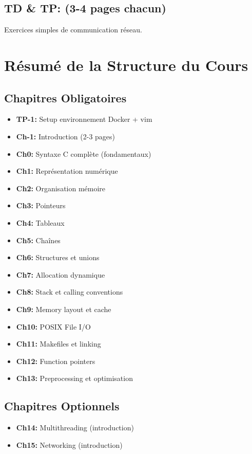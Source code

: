 \documentclass[10pt,a4paper]{article}
\begin{document}
\subsection*{TD \& TP: (3-4 pages chacun)}

Exercices simples de communication réseau.

\newpage

\section*{Résumé de la Structure du Cours}

\subsection*{Chapitres Obligatoires}

\begin{itemize}
\item \textbf{TP-1:} Setup environnement Docker + vim
\item \textbf{Ch-1:} Introduction (2-3 pages)
\item \textbf{Ch0:} Syntaxe C complète (fondamentaux)
\item \textbf{Ch1:} Représentation numérique
\item \textbf{Ch2:} Organisation mémoire
\item \textbf{Ch3:} Pointeurs
\item \textbf{Ch4:} Tableaux
\item \textbf{Ch5:} Chaînes
\item \textbf{Ch6:} Structures et unions
\item \textbf{Ch7:} Allocation dynamique
\item \textbf{Ch8:} Stack et calling conventions
\item \textbf{Ch9:} Memory layout et cache
\item \textbf{Ch10:} POSIX File I/O
\item \textbf{Ch11:} Makefiles et linking
\item \textbf{Ch12:} Function pointers
\item \textbf{Ch13:} Preprocessing et optimisation
\end{itemize}

\subsection*{Chapitres Optionnels}

\begin{itemize}
\item \textbf{Ch14:} Multithreading (introduction)
\item \textbf{Ch15:} Networking (introduction)
\end{itemize}
\end{document}
